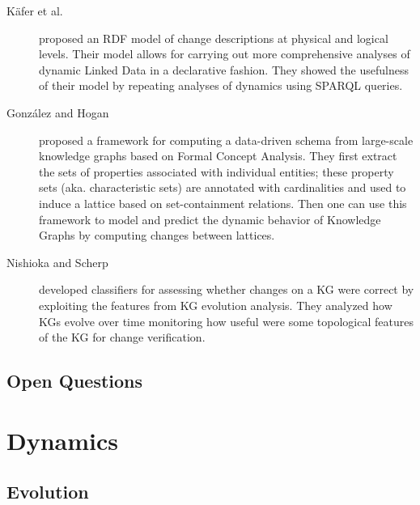 \documentclass[sw]{iosart2x}
\begin{document}
\begin{description}
	\item[K{\"{a}}fer et al. \cite{KaferWA17}] proposed an RDF model of change descriptions at physical and logical levels. Their model allows for carrying out more comprehensive analyses of dynamic Linked Data in a declarative fashion. They showed the usefulness of their model by repeating analyses of dynamics using SPARQL queries.
	
	
	\item[Gonz\'{a}lez and Hogan \cite{GonzalezH18}]proposed a framework for computing a data-driven schema from large-scale knowledge graphs based on Formal Concept Analysis. They first extract the sets of properties associated with individual entities; these property sets (aka. characteristic sets) are annotated with cardinalities and used to induce a lattice based on set-containment relations. Then one can use this framework to model and predict the dynamic behavior of Knowledge Graphs by computing changes between lattices.
	
	\item[Nishioka and Scherp \cite{NishiokaS18}] developed classifiers for assessing whether changes on a KG were correct by exploiting the features from KG evolution analysis. They analyzed how KGs evolve over time monitoring how useful were some topological features of the KG for change verification.
	
	
\end{description}



\subsection{Open Questions}\label{Open1}


\section{Dynamics}\label{Change}

\subsection{Evolution}
\end{document}
